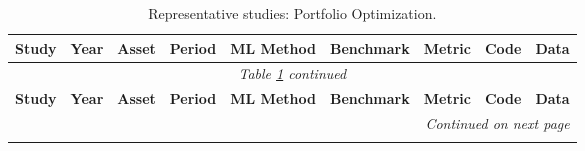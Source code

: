 \begin{longtable}{@{}p{2.4cm} c p{1.0cm} p{1.0cm} p{2.0cm} p{1.9cm} p{1.4cm} c p{1.4cm}@{}}
\caption{Representative studies: Portfolio Optimization.}\label{tab:master_portfolio} \\
\toprule
\textbf{Study} & \textbf{Year} & \textbf{Asset} & \textbf{Period} & \textbf{ML Method} & \textbf{Benchmark} & \textbf{Metric} & \textbf{Code} & \textbf{Data} \\
\midrule
\endfirsthead
\multicolumn{9}{c}{\textit{Table \ref{tab:master_portfolio} continued}} \\
\toprule
\textbf{Study} & \textbf{Year} & \textbf{Asset} & \textbf{Period} & \textbf{ML Method} & \textbf{Benchmark} & \textbf{Metric} & \textbf{Code} & \textbf{Data} \\
\midrule
\endhead
\midrule
\multicolumn{9}{r}{\textit{Continued on next page}} \\
\endfoot
\bottomrule
\endlastfoot


\end{longtable}
